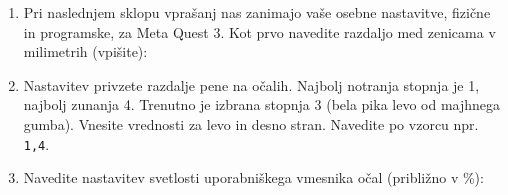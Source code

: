 \documentclass[a4paper, 12pt]{book}
\begin{document}
\begin{enumerate}
    \item Pri naslednjem sklopu vprašanj nas zanimajo vaše osebne nastavitve,
    fizične in programske, za Meta Quest 3. Kot prvo navedite razdaljo med
    zenicama v milimetrih (vpišite): \dotfill

    \item Nastavitev privzete razdalje pene na očalih. Najbolj notranja
    stopnja je 1, najbolj zunanja 4. Trenutno je izbrana stopnja 3
    (bela pika levo od majhnega gumba). Vnesite vrednosti za levo in desno
    stran. Navedite po vzorcu npr. \texttt{1,4}. \dotfill

    \item Navedite nastavitev svetlosti uporabniškega vmesnika očal
    (približno v \%): \dotfill
\end{enumerate}




\end{document}

